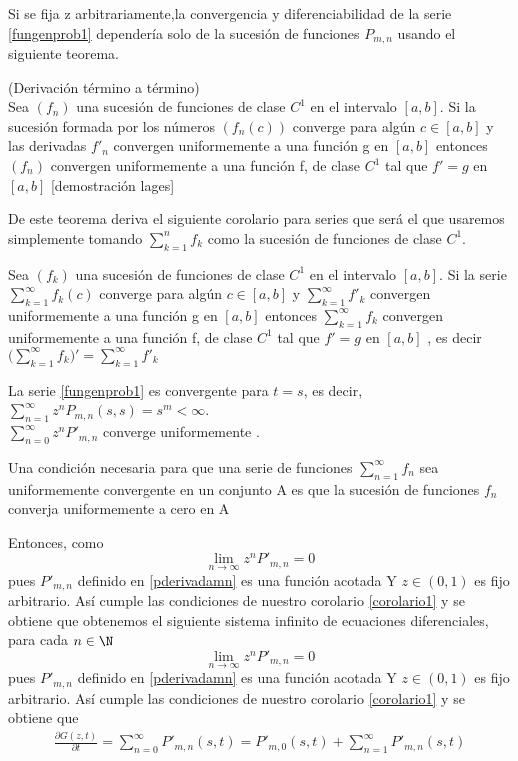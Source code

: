 Si se fija z arbitrariamente,la convergencia y diferenciabilidad de la serie  \ref{fungenprob1} dependería solo de la sucesión de funciones $P_{m,n}$ usando el siguiente teorema.
\begin{Teo}
    (Derivación término a término)\\Sea $(f_n)$ una sucesión de funciones de clase $C^1$ en el intervalo $[a,b]$. Si la sucesión formada por los números $(f_n(c))$ converge para algún $c\in[a,b]$ y las derivadas $f'_n$ convergen uniformemente a una función g en $[a,b]$ entonces $(f_n)$ convergen uniformemente a una función f, de clase $C^1$ tal que $f'=g$ en $[a,b]$ [demostración lages]
\end{Teo} 
De este teorema deriva el siguiente corolario para series que será el que usaremos simplemente tomando $\sum_{k=1}^n f_k$ como la sucesión de funciones de clase $C^1$.
\begin{Cor}
    Sea $(f_k)$ una sucesión de funciones de clase $C^1$ en el intervalo $[a,b]$. Si la serie $\sum_{k=1}^\infty f_k(c)$ converge para algún $c\in[a,b]$ y  $\sum_{k=1}^\infty f'_k$ convergen uniformemente a una función g en $[a,b]$ entonces $\sum_{k=1}^\infty f_k$ convergen uniformemente a una función f, de clase $C^1$ tal que $f'=g$ en $[a,b]$ , es decir $\bigg(\sum_{k=1}^\infty f_k\bigg)'=\sum_{k=1}^\infty f'_k$\label{corolario1}
\end{Cor}
    La serie \ref{fungenprob1} es convergente para $t=s$, es decir, $\sum_{n=1}^\infty z^n P_{m,n}(s,s)=s^m<\infty$.\\$\sum_{n=0}^\infty z^nP'_{m,n}$ converge uniformemente .
\begin{Cor}
    Una condición necesaria para que una serie de funciones $\sum_{n=1}^\infty f_n$ sea uniformemente convergente en un conjunto A es que la sucesión de funciones $f_n$ converja uniformemente a cero en A
\end{Cor}
Entonces, como $$\lim_{n\to\infty}z^nP'_{m,n}=0$$ pues $P'_{m,n}$ definido en \ref{pderivadamn} es una función acotada Y $z\in(0,1)$ es fijo arbitrario.
Así cumple las condiciones de nuestro corolario \ref{corolario1} y se obtiene que  obtenemos el siguiente sistema infinito de ecuaciones diferenciales, para cada $n\in\N$
 $$\lim_{n\to\infty}z^n P'_{m,n}=0$$ pues $P'_{m,n}$ definido en \ref{pderivadamn} es una función acotada Y $z\in(0,1)$ es fijo arbitrario.
Así cumple las condiciones de nuestro corolario \ref{corolario1} y se obtiene que 
\begin{eqnarray}
    \frac{\partial G(z,t)}{\partial t}=\sum_{n=0}^\infty P'_{m,n}(s,t)=P'_{m,0}(s,t)+\sum_{n=1}^\infty P'_{m,n}(s,t)
\end{eqnarray}
